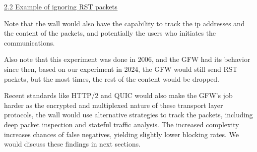 \begin{Shaded}
\begin{Highlighting}[]
\end{Highlighting}
\end{Shaded}

\href{}{2.2 Example of ignoring RST packets}

Note that the wall would also have the capability to track the ip
addresses and the content of the packets, and potentially the users who
initiates the communications.

Also note that this experiment was done in 2006, and the GFW had its
behavior since then, based on our experiment in 2024, the GFW would
still send RST packets, but the most times, the rest of the content
would be dropped.

Recent standards like HTTP/2 and QUIC would also make the GFW's job
harder as the encrypted and multiplexed nature of these transport layer
protocols, the wall would use alternative strategies to track the
packets, including deep packet inspection and stateful traffic analysis.
The increased complexity increases chances of false negatives, yielding
slightly lower blocking rates. We would discuss these findings in next
sections.

